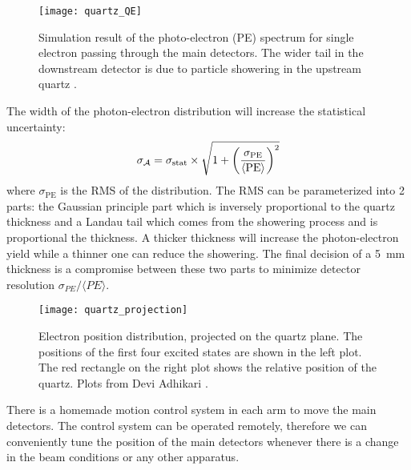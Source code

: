 \begin{figure}[!h]
    \centering
    \texttt{[image: quartz\_QE]}
    \caption[photo-electron spectrum of quartz]
    {Simulation result of the photo-electron (PE) spectrum for single electron
    passing through the main detectors. The wider tail in the downstream
    detector is due to particle showering in the upstream quartz \cite{Devi2021}. 
    }
\end{figure}
The width of the photon-electron distribution will increase the statistical uncertainty:
\begin{equation}
    \sigma_{\mathcal{A}} = \sigma_{\text{stat}} \times \sqrt{1 + \left( \frac{\sigma_{\text{PE}}}{\langle \text{PE} \rangle }\right)^2}
\end{equation}
where $\sigma_{\text{PE}}$ is the RMS of the distribution. The RMS can be parameterized
into 2 parts: the Gaussian principle part which is inversely proportional to
the quartz thickness and a Landau tail which comes from the showering process
and is proportional the thickness. A thicker thickness will increase the 
photon-electron yield while a thinner one can reduce the showering.
The final decision of a 5~mm thickness is a compromise between these two parts 
to minimize detector resolution $\sigma_{PE}/\langle PE \rangle$. 

\begin{figure}[!h]
    \centering
    \texttt{[image: quartz\_projection]}
    \caption[Electron position distribution, projected on the quartz plane.]
    {Electron position distribution, projected on the quartz plane. 
    The positions of the first four excited states are shown in the left plot. 
    The red rectangle on the right plot shows the relative position of the quartz.
    Plots from Devi Adhikari \cite{Devi2021}.}
\end{figure}

There is a homemade motion control system in each arm to move the main detectors.
The control system can be operated remotely, therefore we can conveniently tune
the position of the main detectors whenever there is a change in the beam
conditions or any other apparatus.


